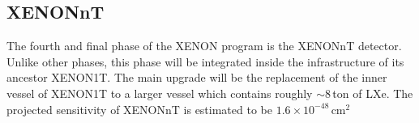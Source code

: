 \subsection{XENONnT}
\label{sec:xenT}

The fourth and final phase of the XENON program is the XENONnT detector. Unlike other phases, this phase will be integrated inside the infrastructure of its ancestor XENON1T. The main upgrade will be the replacement of the inner vessel of XENON1T to a larger vessel which contains roughly $\sim8$\,ton of LXe. The projected sensitivity of XENONnT is estimated to be $1.6\times10^{-48}$\,cm$^{2}$ 
%
%
